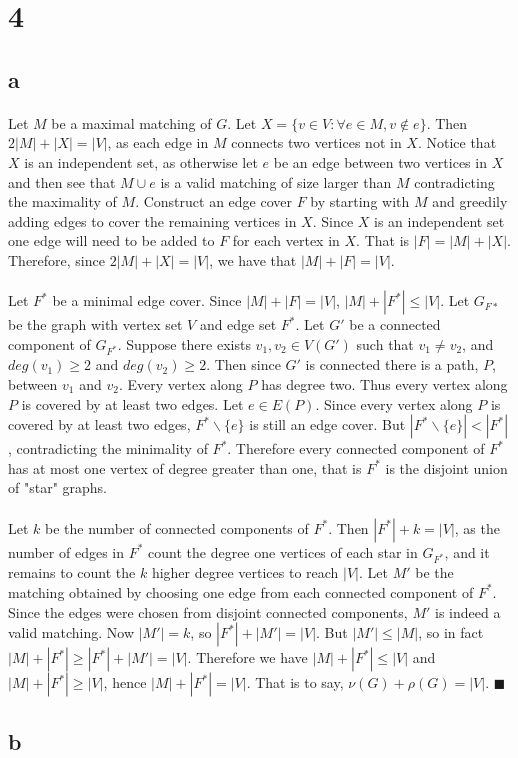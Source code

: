 \documentclass[letterpaper,12pt,oneside,onecolumn]{report}
\begin{document}
\section*{4}
\subsection*{a}
\paragraph{}
Let $M$ be a maximal matching of $G$. Let $X = \{v \in V : \forall e \in M, v \not\in e\}$. Then $2|M| + |X| = |V|$, as each edge in $M$ connects two vertices not in $X$. Notice that $X$ is an independent set, as otherwise let $e$ be an edge between two vertices in $X$ and then see that $M \cup e $ is a valid matching of size larger than $M$ contradicting the maximality of $M$. Construct an edge cover $F$ by starting with $M$ and greedily adding edges to cover the remaining vertices in $X$. Since $X$ is an independent set one edge will need to be added to $F$ for each vertex in $X$. That is $|F| = |M| + |X|$. Therefore, since $2|M| + |X| = |V|$, we have that $|M| + |F| = |V|$.
\paragraph{}
Let $F^*$ be a minimal edge cover. Since $|M| + |F| = |V|$, $|M| + |F^*| \leq |V|$. Let $G_{F*}$ be the graph with vertex set $V$ and edge set $F^*$. Let $G'$ be a connected component of $G_{F^*}$. Suppose there exists $v_1, v_2 \in V(G')$ such that $v_1 \neq v_2$, and $deg(v_1) \geq 2$ and $deg(v_2)\geq 2$. Then since $G'$ is connected there is a path, $P$, between $v_1$ and $v_2$. Every vertex along $P$ has degree two. Thus every vertex along $P$ is covered by at least two edges. Let $e \in E(P)$. Since every vertex along $P$ is covered by at least two edges, $F^* \backslash \{e\}$ is still an edge cover. But $|F^* \backslash \{e\}| < |F^*|$, contradicting the minimality of $F^*$. Therefore every connected component of $F^*$ has at most one vertex of degree greater than one, that is $F^*$ is the disjoint union of "star" graphs.
\paragraph{}
Let $k$ be the number of connected components of $F^*$. Then $|F^*| + k = |V|$, as the number of edges in $F^*$ count the degree one vertices of each star in $G_{F^*}$, and it remains to count the $k$ higher degree vertices to reach $|V|$. Let $M'$ be the matching obtained by choosing one edge from each connected component of $F^*$. Since the edges were chosen from disjoint connected components, $M'$ is indeed a valid matching. Now $|M'| = k$, so $|F^*| + |M'| = |V|$. But $|M'| \leq |M|$, so in fact $|M| + |F^*| \geq |F^*| + |M'| = |V|$. Therefore we have $|M| + |F^*| \leq |V|$ and $|M| + |F^*| \geq |V|$, hence $|M| + |F^*| = |V|$. That is to say, $\nu(G) + \rho(G) = |V|$. $\blacksquare$
\subsection*{b}
\end{document}
